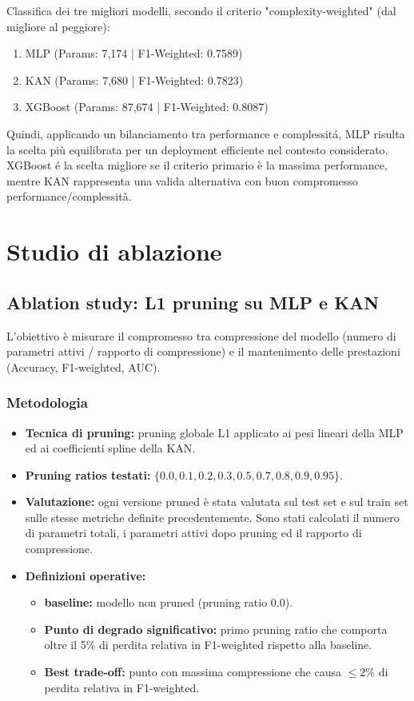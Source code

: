 \documentclass[a4paper,12pt]{report}
\begin{document}
	Classifica dei tre migliori modelli, secondo il criterio "complexity-weighted" (dal migliore al peggiore):
	\begin{enumerate}
		\item MLP \quad (Params: 7,174 \;|\; F1-Weighted: 0.7589)
		\item KAN \quad (Params: 7,680 \;|\; F1-Weighted: 0.7823)
		\item XGBoost \quad (Params: 87,674 \;|\; F1-Weighted: 0.8087)
	\end{enumerate}
	Quindi, applicando un bilanciamento tra performance e complessitá, MLP risulta la scelta più equilibrata per un deployment efficiente nel contesto considerato. XGBoost é la scelta migliore se il criterio primario è la massima performance, mentre KAN rappresenta una valida alternativa con buon compromesso performance/complessità.
	
	\section{Studio di ablazione}
	
	\subsection{Ablation study: L1 pruning su MLP e KAN}
	L'obiettivo è misurare il compromesso tra compressione del modello (numero di parametri attivi / rapporto di compressione) e il mantenimento delle prestazioni (Accuracy, F1-weighted, AUC).
	
	\subsubsection{Metodologia}
	\begin{itemize}
		\item \textbf{Tecnica di pruning:} pruning globale L1 applicato ai pesi lineari della MLP ed ai coefficienti spline della KAN.
		\item \textbf{Pruning ratios testati:} \(\{0.0, 0.1, 0.2, 0.3, 0.5, 0.7, 0.8, 0.9, 0.95\}\).
		\item \textbf{Valutazione:} ogni versione pruned è stata valutata sul test set e sul train set sulle stesse metriche definite precedentemente. Sono stati calcolati il numero di parametri totali, i parametri attivi dopo pruning ed il rapporto di compressione.
		\item \textbf{Definizioni operative:} 
		\begin{itemize}
			\item \textbf{baseline:} modello non pruned (pruning ratio 0.0).
			\item \textbf{Punto di degrado significativo:} primo pruning ratio che comporta oltre il 5\% di perdita relativa in F1-weighted rispetto alla baseline.
			\item \textbf{Best trade-off:} punto con massima compressione che causa \(\le 2\%\) di perdita relativa in F1-weighted.
		\end{itemize}
	\end{itemize}
	
\end{document}
